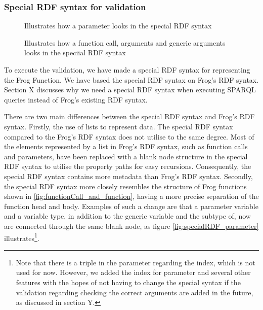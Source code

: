 \subsubsection{Special RDF syntax for validation}
\begin{figure}
  \begin{minipage}{.4\textwidth}
    
      \caption{Illustrates how a parameter looks in the special RDF syntax}
    \label{fig:specialRDF_parameter}
  \end{minipage}%
  \begin{minipage}{.5\textwidth}
    \centering
    
    \caption{Illustrates how a function call, arguments and generic arguments looks in the speciial RDF syntax}
    \label{fig:specialRDF_functionCall}
  \end{minipage}
\end{figure}
\begin{figure}
  
\end{figure}
To execute the validation, we have made a special RDF syntax for representing the Frog Function. We have based the special RDF syntax on Frog's RDF syntax. Section X discusses why we need a special RDF syntax when executing SPARQL queries instead of Frog's existing RDF syntax. 

\para
There are two main differences between the special RDF syntax and Frog's RDF syntax. Firstly, the use of lists to represent data. The special RDF syntax compared to the Frog's RDF syntax does not utilise to the same degree. Most of the elements represented by a list in Frog's RDF syntax, such as function calls and parameters, have been replaced with a blank node structure in the special RDF syntax to utilise the property paths for easy recursions. Consequently, the special RDF syntax contains more metadata than Frog's RDF syntax. Secondly, the special RDF syntax more closely resembles the structure of Frog functions shown in \ref{fig:functionCall_and_function}, having a more precise separation of the function head and body. Examples of such a change are that a parameter variable and a variable type, in addition to the generic variable and the subtype of, now are connected through the same blank node, as figure \ref{fig:specialRDF_parameter} illustrates\footnote{Note that there is a triple in the parameter regarding the index, which is not used for now. However, we added the index for parameter and several other features with the hopes of not having to change the special syntax if the validation regarding checking the correct arguments are added in the future, as discussed in section Y.}.

